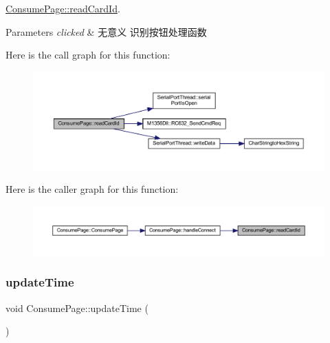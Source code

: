 \mbox{\hyperlink{class_consume_page_a00810bb404e95cf82b060d366a127b23}{Consume\+Page\+::read\+Card\+Id}}. 


\begin{DoxyParams}{Parameters}
{\em clicked} & 无意义 识别按钮处理函数 \\
\hline
\end{DoxyParams}
Here is the call graph for this function\+:
\nopagebreak
\begin{figure}[H]
\begin{center}
\leavevmode
\includegraphics[width=350pt]{class_consume_page_a00810bb404e95cf82b060d366a127b23_cgraph}
\end{center}
\end{figure}
Here is the caller graph for this function\+:
\nopagebreak
\begin{figure}[H]
\begin{center}
\leavevmode
\includegraphics[width=350pt]{class_consume_page_a00810bb404e95cf82b060d366a127b23_icgraph}
\end{center}
\end{figure}
\mbox{\label{class_consume_page_ad00cdadd4302bfb963b4e1c2487b7653}} 
\subsubsection{\texorpdfstring{updateTime}{updateTime}}
{\footnotesize\ttfamily void Consume\+Page\+::update\+Time (\begin{DoxyParamCaption}{ }\end{DoxyParamCaption})\hspace{0.3cm}{\ttfamily [slot]}}



